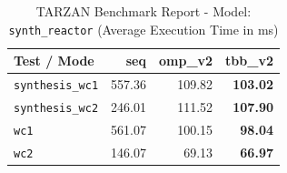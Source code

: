 \begin{table}[htbp]
\centering
\caption{TARZAN Benchmark Report - Model: \texttt{synth\_reactor} (Average Execution Time in ms)}
\label{tab:synth_reactor_benchmark}
\begin{tabular}{lrrr}
\toprule
\textbf{Test / Mode} & \textbf{seq} & \textbf{omp\_v2} & \textbf{tbb\_v2} \\
\midrule
\texttt{synthesis\_wc1} & 557.36 & 109.82 & \textbf{103.02} \\
\texttt{synthesis\_wc2} & 246.01 & 111.52 & \textbf{107.90} \\
\texttt{wc1} & 561.07 & 100.15 & \textbf{98.04} \\
\texttt{wc2} & 146.07 & 69.13 & \textbf{66.97} \\
\bottomrule
\end{tabular}
\end{table}